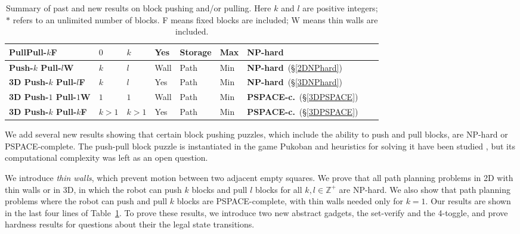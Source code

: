 \begin{table}
{\begin{tabular}{|l|l|l|l|l|l|l|l|l|}
PullPull-$k$F & $0$ & $k$ & Yes & Storage  & Max  & NP-hard\cite{Pull10} \\ \hline
\textbf{Push-$k$ Pull-$l$W} & $k$ & $l$ & Wall & Path  & Min & \textbf{NP-hard}\ (\S  \ref{2DNPhard}) \\ \hline
\textbf{3D Push-$k$ Pull-$l$F} & $k$ & $l$ & Yes & Path & Min &  \textbf{NP-hard}\ (\S  \ref{3DNPhard}) \\ \hline
\textbf{3D Push-$1$ Pull-$1$W} & $1$ & $1$ & Wall & Path & Min &  \textbf{PSPACE-c.}\ (\S  \ref{3DPSPACE}) \\ \hline
\textbf{3D Push-$k$ Pull-$k$F} & $k > 1$ & $k >1$ & Yes & Path & Min &  \textbf{PSPACE-c.}\ (\S  \ref{3DPSPACE}) \\ \hline
\end{tabular}
}
\caption{Summary of past and new results on block pushing and/or pulling. Here $k$ and $l$ are positive integers; $*$ refers to an unlimited number of blocks. F means fixed blocks are included; W means thin walls are included.}
\label{BlocksTable}
\end{table}

We add several new results showing that certain block pushing puzzles, which include the ability to push and pull blocks, are NP-hard or PSPACE-complete. The push-pull block puzzle is instantiated in the game Pukoban and heuristics for solving it have been studied \cite{zubaranagent}, but its computational complexity was left as an open question.

We introduce \emph{thin walls}, which prevent motion between two adjacent empty squares. We prove that all path planning problems in 2D with thin walls or in 3D, in which the robot can push $k$ blocks and pull $l$ blocks for all $k,l \in \mathbb{Z}^+$ are NP-hard. We also show that path planning problems where the robot can push and pull $k$ blocks are PSPACE-complete, with thin walls needed only for $k=1$. Our results are shown in the last four lines of Table~\ref{BlocksTable}. To prove these results, we introduce two new abstract gadgets, the set-verify and the 4-toggle, and prove hardness results for questions about their the legal state transitions. %

